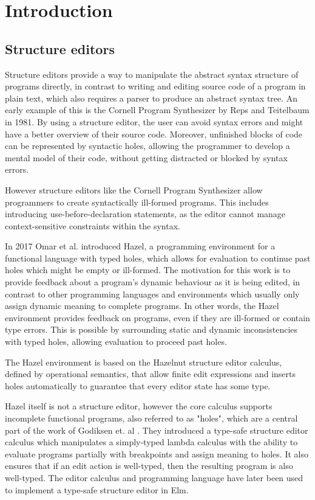 \section{Introduction}

\subsection{Structure editors}
Structure editors provide a way to manipulate the abstract syntax structure of programs directly, in contrast to writing and editing source code of a program in plain text, which also requires a parser to produce an abstract syntax tree. An early example of this is the Cornell Program Synthesizer by Reps and Teitelbaum\cite{timtom81} in 1981.
By using a structure editor, the user can avoid syntax errors and might have a better overview of their source code. Moreover, unfinished blocks of code can be represented by syntactic holes, allowing the programmer to develop a mental model of their code, without getting distracted or blocked by syntax errors.

However structure editors like the Cornell Program Synthesizer\cite{timtom81} allow programmers to create syntactically ill-formed programs. This includes introducing use-before-declaration statements, as the editor cannot manage context-sensitive constraints within the syntax.

In 2017 Omar et al. introduced Hazel\cite{omar}, a programming environment for a functional language with typed holes, which allows for evaluation to continue past holes which might be empty or ill-formed. The motivation for this work is to provide feedback about a program's dynamic behaviour as it is being edited, in contrast to other programming languages and environments which usually only assign dynamic meaning to complete programs. In other words, the Hazel environment\cite{omar} provides feedback on programs, even if they are ill-formed or contain type errors. This is possible by surrounding static and dynamic inconsistencies with typed holes, allowing evaluation to proceed past holes.

The Hazel environment is based on the Hazelnut structure editor calculus, defined by operational semantics, that allow finite edit expressions and inserts holes automatically to guarantee that every editor state has some type.

Hazel itself is not a structure editor, however the core calculus supports incomplete functional programs, also referred to as "holes", which are a central part of the work of Godiksen et. al \cite{godiksen}. They introduced a type-safe structure editor calculus which manipulates a simply-typed lambda calculus with the ability to evaluate programs partially with breakpoints and assign meaning to holes. It also ensures that if an edit action is well-typed, then the resulting program is also well-typed. The editor calculus and programming language have later been used to implement a type-safe structure editor in Elm\cite{KU-bach-missing-ref}.


